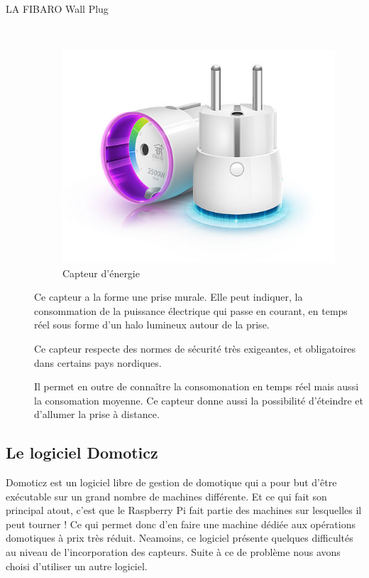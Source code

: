 \begin{description}
\item[LA FIBARO Wall Plug] \hfill \\
\begin{figure}[h!]
	\center
	\includegraphics[scale=0.5]{./Images/jpg/WallPlug_FibaroDevice.jpg}
	\caption{Capteur d'énergie}
\end{figure}

\vspace{1pt}
Ce capteur a la forme une prise murale. Elle peut indiquer, la consommation de la puissance électrique qui passe en courant, en temps réel sous forme d'un halo lumineux autour de la prise.

Ce capteur respecte des normes de sécurité très exigeantes, et obligatoires dans certains pays nordiques.

Il permet en outre de connaître la consomonation en temps réel mais aussi la consomation moyenne. Ce capteur donne aussi la possibilité d'éteindre et d'allumer la prise à distance.

\end{description}



\subsection{Le logiciel Domoticz}
Domoticz est un logiciel libre de gestion de domotique qui a pour but d’être exécutable sur un grand nombre de machines différente. Et ce qui fait son principal atout, c’est que le Raspberry Pi fait partie des machines sur lesquelles il peut tourner ! Ce qui permet donc d’en faire une machine dédiée aux opérations domotiques à prix très réduit. 
Neamoins, ce logiciel présente quelques difficultés au niveau de l'incorporation des capteurs. Suite à ce de problème nous avons choisi d'utiliser un autre logiciel.

